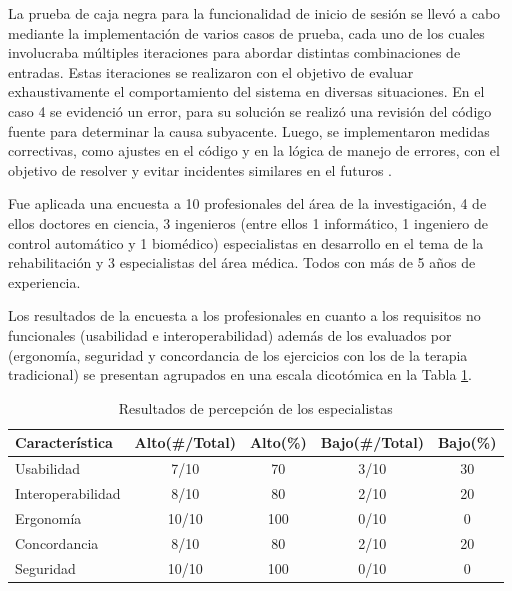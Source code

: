 La prueba de caja negra para la funcionalidad de inicio de sesión se llevó a cabo mediante la implementación de varios casos de prueba, cada uno de los cuales involucraba múltiples iteraciones para abordar distintas combinaciones de entradas. Estas iteraciones se realizaron con el objetivo de evaluar exhaustivamente el comportamiento del sistema en diversas situaciones. En el caso 4 se evidenció un error, para su solución se realizó una revisión del código fuente para determinar la causa subyacente. Luego, se implementaron medidas correctivas, como ajustes en el código y en la lógica de manejo de errores, con el objetivo de resolver y evitar incidentes similares en el futuros .

Fue aplicada una encuesta a 10 profesionales del área de la investigación, 4 de ellos doctores en ciencia, 3 ingenieros (entre ellos 1 informático, 1 ingeniero de control automático y 1 biomédico) especialistas en desarrollo en el tema de la rehabilitación y 3 especialistas del área médica. Todos con más de 5 años de experiencia.

Los resultados de la encuesta a los profesionales en cuanto a los requisitos no funcionales (usabilidad e interoperabilidad) además de los evaluados por \cite{franco2016sistema} (ergonomía, seguridad y concordancia de los ejercicios con los de la terapia tradicional) se presentan agrupados en una escala dicotómica en la Tabla \ref{table:test}.

\begin{table}[ht]
    \centering
    \begin{tabular}{p{3cm} c c c c}
        \hline
        Característica      &  Alto(\#/Total)   &  Alto(\%) & Bajo(\#/Total)  & Bajo(\%) \\\hline
        Usabilidad          &  7/10   &  70   & 3/10  &   30\\
        Interoperabilidad   &  8/10   &  80   & 2/10  &   20\\
        Ergonomía           &  10/10  &  100  & 0/10  &   0\\
        Concordancia        &  8/10   &  80   & 2/10  &   20\\
        Seguridad           &  10/10  &  100  & 0/10  &   0\\
        \hline        
    \end{tabular}        
    \caption{Resultados de percepción de los especialistas}
    \label{table:test}
\end{table}

